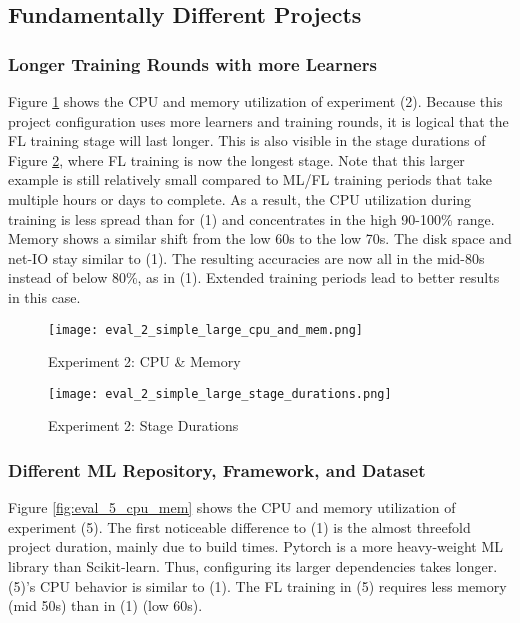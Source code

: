 \subsection{Fundamentally Different Projects}

\subsubsection{Longer Training Rounds with more Learners}

Figure \ref{fig:eval_2_cpu_mem} shows the CPU and memory utilization of experiment (2).
Because this project configuration uses more learners and training rounds, it is logical that the FL training stage will last longer.
This is also visible in the stage durations of Figure \ref{fig:eval_2_simplest_stage_durations}, where FL training is now the longest stage.
Note that this larger example is still relatively small compared to ML/FL training periods that take multiple hours or days to complete.
As a result, the CPU utilization during training is less spread than for (1) and concentrates in the high 90-100\% range.
Memory shows a similar shift from the low 60s to the low 70s.
The disk space and net-IO stay similar to (1).
The resulting accuracies are now all in the mid-80s instead of below 80\%, as in (1).
Extended training periods lead to better results in this case.

\begin{figure}[H]
    \begin{adjustwidth}{-0.2\paperwidth}{-0.2\paperwidth}
        \centering
        \texttt{[image: eval\_2\_simple\_large\_cpu\_and\_mem.png]}
        \caption{Experiment 2: CPU \& Memory}
        \label{fig:eval_2_cpu_mem}
    \end{adjustwidth}
\end{figure}

\begin{figure}[H]
    \begin{adjustwidth}{-0.2\paperwidth}{-0.2\paperwidth}
        \centering
        \texttt{[image: eval\_2\_simple\_large\_stage\_durations.png]}
        \caption{Experiment 2: Stage Durations}
        \label{fig:eval_2_simplest_stage_durations}
    \end{adjustwidth}
\end{figure}

\subsubsection{Different ML Repository, Framework, and Dataset}
Figure \ref{fig:eval_5_cpu_mem} shows the CPU and memory utilization of experiment (5).
The first noticeable difference to (1) is the almost threefold project duration, mainly due to build times.
Pytorch is a more heavy-weight ML library than Scikit-learn.
Thus, configuring its larger dependencies takes longer.
(5)'s CPU behavior is similar to (1).
The FL training in (5) requires less memory (mid 50s) than in (1) (low 60s).

